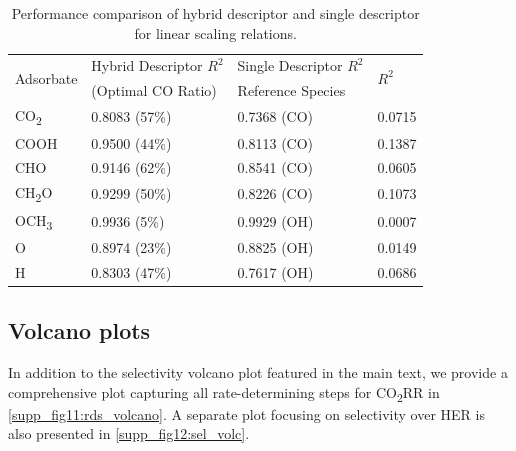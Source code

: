 \begin{table}[htbp]
\label{supp_table14:hybrid_des_perf}
  \caption{Performance comparison of hybrid descriptor and single
    descriptor for linear scaling relations.}
  \small
  \center
  \begin{tabularx}{0.75\textwidth}{@{}l *{3}{X} @{}}
    \toprule
    \multirow{2}{*}{Adsorbate} & Hybrid Descriptor $R^2$ & Single Descriptor $R^2$ & \multirow{2}{*}{$R^2$} \\
                               & (Optimal CO Ratio)      & Reference Species       &                        \\
    \midrule
    CO\textsubscript{2}   & 0.8083 (57\%)  & 0.7368 (CO)  & 0.0715  \\
    COOH                  & 0.9500 (44\%)  & 0.8113 (CO)  & 0.1387  \\
    CHO                   & 0.9146 (62\%)  & 0.8541 (CO)  & 0.0605  \\
    CH\textsubscript{2}O  & 0.9299 (50\%)  & 0.8226 (CO)  & 0.1073  \\
    OCH\textsubscript{3}  & 0.9936 (5\%)   & 0.9929 (OH)  & 0.0007  \\
    O                     & 0.8974 (23\%)  & 0.8825 (OH)  & 0.0149  \\
    H                     & 0.8303 (47\%)  & 0.7617 (OH)  & 0.0686  \\
    \bottomrule
  \end{tabularx}
\end{table}

\subsection{Volcano plots}
\label{supp_sec2.6_volcano}

In addition to the selectivity volcano plot featured in the main text, we provide a comprehensive plot capturing all rate-determining steps for CO\textsubscript{2}RR in \cref{supp_fig11:rds_volcano}. A separate plot focusing on selectivity over HER is also presented in \cref{supp_fig12:sel_volc}.

